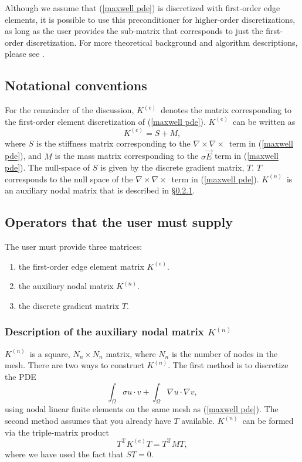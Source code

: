 \documentclass{article}[11pt]
\newcommand{\be}  {\begin{enumerate}}
\newcommand{\ee}  {\end{enumerate}}
\newcommand \Ke {\ensuremath{K^{(e)}}}
\newcommand \Kn {\ensuremath{K^{(n)}}}
\newcommand \curlcurl {\ensuremath{\nabla\times\nabla\times}}
\begin{document}
Although we assume that (\ref{maxwell pde}) is discretized with
first-order edge elements, it is possible to use this preconditioner for
higher-order discretizations, as long as the user provides the sub-matrix
that corresponds to just the first-order discretization.
For more theoretical background and algorithm descriptions, please see
\cite{HTBGR_2004,BGHRT_2003}.

\subsection{Notational conventions}\label{maxwell notation}
For the remainder of the discussion, \Ke\ denotes the matrix corresponding to
the first-order element discretization of (\ref{maxwell pde}).   \Ke\ can be
written as
$$\Ke = S + M,$$
where $S$ is the stiffness matrix corresponding to the \curlcurl\ term in
(\ref{maxwell pde}), and $M$ is the mass matrix corresponding to the $\sigma\vec{E}$
term in (\ref{maxwell pde}).
The null-space of $S$ is given by the discrete gradient matrix, $T$.
$T$ corresponds to the null space of the \curlcurl\ term in
(\ref{maxwell pde}).
\Kn\ is an auxiliary nodal matrix that is described in \S\ref{Kn matrix}.

\subsection{Operators that the user must supply}
The user must provide three matrices:
\be
\item the first-order edge element matrix \Ke.
\item the auxiliary nodal matrix \Kn.
\item the discrete gradient matrix $T$.
\ee

\subsubsection{Description of the auxiliary nodal matrix \Kn}\label{Kn matrix}
%
\Kn\ is a square, $N_n\times N_n$ matrix, where $N_n$ is the number of nodes in
the mesh.
There are two ways to construct \Kn.
The first method is to discretize the PDE
\begin{equation}
   \int_\Omega \sigma u \cdot v + \int_\Omega \nabla u \cdot \nabla v,
   \label{nodal pde}
\end{equation}
using nodal linear finite elements on the same mesh as (\ref{maxwell pde}).
The second method assumes that you already have $T$ available.
\Kn\ can be formed via the triple-matrix product $$T^{\mathrm{T}}\Ke T =
T^{\mathrm{T}}M T,$$
where we have used the fact that $ST=0$.
%
\end{document}
